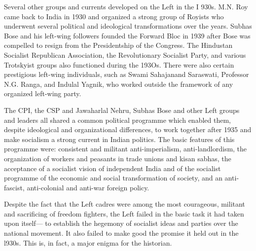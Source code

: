 Several other groups and currents developed on the Left in the I 930s. M.N. Roy came back to India in 1930 and organized a strong group of Royists who underwent several political and ideological transformations over the years. Subhas Bose and his left-wing followers founded the Forward Bloc in 1939 after Bose was compelled to resign from the Presidentship of the Congress. The Hindustan Socialist Republican Association, the Revolutionary Socialist Party, and various Trotskyist groups also functioned during the 193Os. There were also certain prestigious left-wing individuals, such as Swami Sahajanand Saraswati, Professor N.G. Ranga, and Indulal Yagnik, who worked outside the framework of any organized left-wing party. 

The CPI, the CSP and Jawaharlal Nehru, Subhas Bose and other Left groups and leaders all shared a common political programme which enabled them, despite ideological and organizational differences, to work together after 1935 and make socialism a strong current in Indian politics. The basic features of this programme were: consistent and militant anti-imperialism, anti-landlordism, the organization of workers and peasants in trade unions and kisan sabhas, the acceptance of a socialist vision of independent India and of the socialist programme of the economic and social transformation of society, and an anti­ fascist, anti-colonial and anti-war foreign policy. 

Despite the fact that the Left cadres were among the most courageous, militant and sacrificing of freedom fighters, the Left failed in the basic task it had taken upon itself— to establish the hegemony of socialist ideas and parties over the national movement. It also failed to make good the promise it held out in the l930s. This is, in fact, a major enigma for the historian. 

